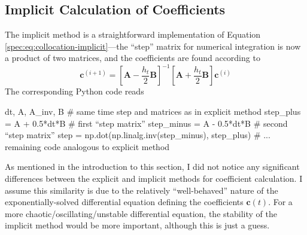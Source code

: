 \documentclass[11pt, a4paper]{article}
\newcommand{\mat}[1]{\mathbf{#1}}
\begin{document}
\subsection{Implicit Calculation of Coefficients}
The implicit method is a straightforward implementation of Equation \ref{spec:eq:collocation-implicit}---the ``step'' matrix for numerical integration is now a product of two matrices, and the coefficients are found according to
\begin{equation*}
	\bm{c}^{(i+1)} = 	\left[\mat{A} - \frac{h_{t}}{2}\mat{B}\right]^{-1}\left[\mat{A} + \frac{h_{t}}{2}\mat{B}\right]\bm{c}^{(i)}
\end{equation*}
The corresponding Python code reads
\begin{python}
dt, A, A_inv, B  # same time step and matrices as in explicit method
step_plus = A + 0.5*dt*B   # first ``step matrix''
step_minus = A - 0.5*dt*B  # second ``step matrix''
step = np.dot(np.linalg.inv(step_minus), step_plus)
# ... remaining code analogous to explicit method
\end{python}
As mentioned in the introduction to this section, I did not notice any significant differences between the explicit and implicit methods for coefficient calculation. I assume this similarity is due to the relatively ``well-behaved'' nature of the exponentially-solved differential equation defining the coefficients $ \bm{c}(t) $. For a more chaotic/oscillating/unstable differential equation, the stability of the implicit method would be more important, although this is just a guess.
\end{document}
